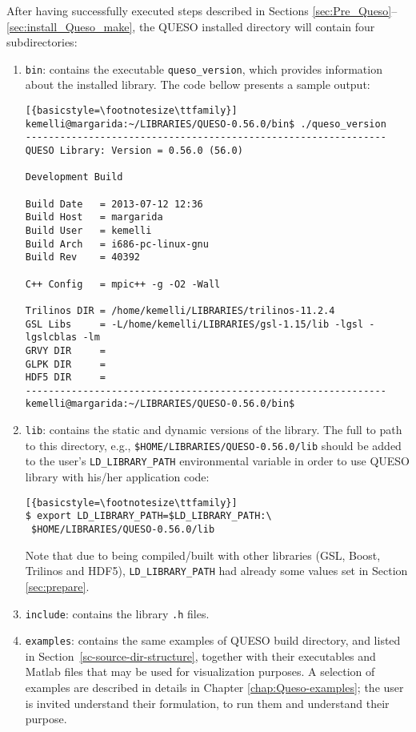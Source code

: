 After having successfully executed steps described in Sections \ref{sec:Pre_Queso}--\ref{sec:install_Queso_make}, the QUESO installed directory will contain four subdirectories:
\begin{enumerate}
 \item \verb+bin+: contains the executable \verb+queso_version+, which provides information about the installed library. The code bellow presents a sample output:

\begin{lstlisting}[{basicstyle=\footnotesize\ttfamily}]
kemelli@margarida:~/LIBRARIES/QUESO-0.56.0/bin$ ./queso_version
---------------------------------------------------------------
QUESO Library: Version = 0.56.0 (56.0)

Development Build

Build Date   = 2013-07-12 12:36
Build Host   = margarida
Build User   = kemelli
Build Arch   = i686-pc-linux-gnu
Build Rev    = 40392

C++ Config   = mpic++ -g -O2 -Wall

Trilinos DIR = /home/kemelli/LIBRARIES/trilinos-11.2.4
GSL Libs     = -L/home/kemelli/LIBRARIES/gsl-1.15/lib -lgsl -lgslcblas -lm
GRVY DIR     =
GLPK DIR     =
HDF5 DIR     =
---------------------------------------------------------------
kemelli@margarida:~/LIBRARIES/QUESO-0.56.0/bin$
\end{lstlisting}

 \item \verb+lib+: contains the static and dynamic versions of the library. The full to path to this directory, e.g., \verb+$HOME/LIBRARIES/QUESO-0.56.0/lib+ should be added to the user's \verb+LD_LIBRARY_PATH+ environmental variable in order to use QUESO library with his/her application code:
\begin{lstlisting}[{basicstyle=\footnotesize\ttfamily}]
$ export LD_LIBRARY_PATH=$LD_LIBRARY_PATH:\
 $HOME/LIBRARIES/QUESO-0.56.0/lib
\end{lstlisting}


Note that due to \Queso{} being compiled/built with other libraries (GSL, Boost, Trilinos and HDF5), \verb+LD_LIBRARY_PATH+ had already some values set in Section \ref{sec:prepare}.


 \item \verb+include+: contains the library \verb+.h+ files.

 \item \verb+examples+: contains the same examples of QUESO build directory, and listed in Section~\ref{sc-source-dir-structure}, together with their executables and Matlab files that may be used for visualization purposes. A selection of examples are described in details in Chapter \ref{chap:Queso-examples}; the user is invited understand their formulation, to run them and understand their purpose.


\end{enumerate}





